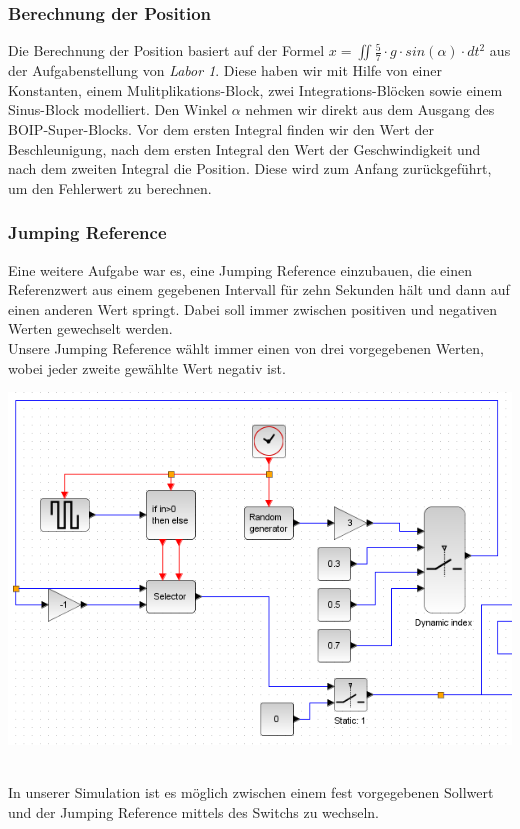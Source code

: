 \subsubsection{Berechnung der Position}
Die Berechnung der Position basiert auf der Formel $ x = \iint \frac{5}{7} \cdot g \cdot sin(\alpha) \cdot d t^2 $ aus der Aufgabenstellung von \textit{Labor 1}. Diese haben wir mit Hilfe von einer Konstanten, einem Mulitplikations-Block, zwei Integrations-Blöcken sowie einem Sinus-Block modelliert. Den Winkel $\alpha $ nehmen wir direkt aus dem Ausgang des BOIP-Super-Blocks. Vor dem ersten Integral finden wir den Wert der Beschleunigung, nach dem ersten Integral den Wert der Geschwindigkeit und nach dem zweiten Integral die Position. Diese wird zum Anfang zurückgeführt, um den Fehlerwert zu berechnen.

\subsubsection{Jumping Reference}
Eine weitere Aufgabe war es, eine Jumping Reference einzubauen, die einen Referenzwert aus einem gegebenen Intervall für zehn Sekunden hält und dann auf einen anderen Wert springt. Dabei soll immer zwischen positiven und negativen Werten gewechselt werden. \\
Unsere Jumping Reference wählt immer einen von drei vorgegebenen Werten, wobei jeder zweite gewählte Wert negativ ist. \\
\begin{center}
	\begin{minipage}{\linewidth}
	\centering
	\includegraphics[scale=0.7]{images/jumping_reference.png}
	\end{minipage}
\end{center}
\ \\
In unserer Simulation ist es möglich zwischen einem fest vorgegebenen Sollwert und der Jumping Reference mittels des Switchs zu wechseln.

